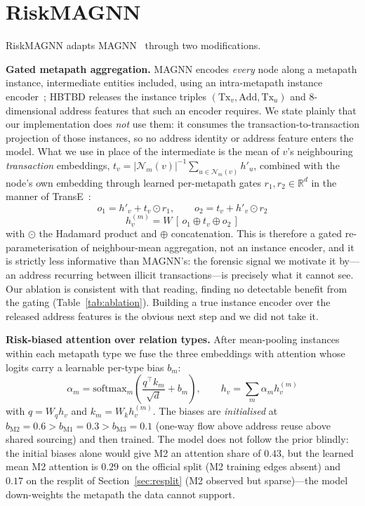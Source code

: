 \documentclass[conference]{IEEEtran}
\begin{document}
\section{RiskMAGNN}

RiskMAGNN adapts MAGNN~\cite{fu2020} through two modifications.

\textbf{Gated metapath aggregation.} MAGNN encodes \emph{every} node along a
metapath instance, intermediate entities included, using an intra-metapath
instance encoder~\cite{fu2020}; HBTBD releases the instance triples
$(\text{Tx}_v,\text{Add},\text{Tx}_u)$ and 8-dimensional address features
that such an encoder requires. We state plainly that our implementation does
\emph{not} use them: it consumes the transaction-to-transaction projection of
those instances, so no address identity or address feature enters the model.
What we use in place of the intermediate is the mean of $v$'s neighbouring
\emph{transaction} embeddings,
$t_v = |\mathcal{N}_m(v)|^{-1}\sum_{u \in \mathcal{N}_m(v)} h'_u$, combined
with the node's own embedding through learned per-metapath gates
$r_1, r_2 \in \mathbb{R}^d$ in the manner of TransE~\cite{bordes2013}:
\begin{equation}
o_1 = h'_v + t_v \odot r_1, \qquad
o_2 = t_v + h'_v \odot r_2
\end{equation}
\begin{equation}
h_v^{(m)} = W\,[\,o_1 \oplus t_v \oplus o_2\,]
\end{equation}
with $\odot$ the Hadamard product and $\oplus$ concatenation. This is
therefore a gated re-parameterisation of neighbour-mean aggregation, not an
instance encoder, and it is strictly less informative than MAGNN's: the
forensic signal we motivate it by---an address recurring between illicit
transactions---is precisely what it cannot see. Our ablation is consistent
with that reading, finding no detectable benefit from the gating
(Table~\ref{tab:ablation}). Building a true instance encoder over the
released address features is the obvious next step and we did not take it.

\textbf{Risk-biased attention over relation types.} After mean-pooling
instances within each metapath type we fuse the three embeddings with
attention whose logits carry a learnable per-type bias $b_m$:
\begin{equation}
\alpha_m = \mathrm{softmax}_m\!\left(\frac{q^\top k_m}{\sqrt{d}} + b_m\right),
\qquad
h_v = \sum_{m} \alpha_m h_v^{(m)}
\end{equation}
with $q = W_q h_v$ and $k_m = W_k h_v^{(m)}$. The biases are
\emph{initialised} at $b_{\text{M2}}=0.6 > b_{\text{M1}}=0.3 >
b_{\text{M3}}=0.1$ (one-way flow above address reuse above shared sourcing)
and then trained. The model does not follow the prior blindly: the initial
biases alone would give M2 an attention share of $0.43$, but the learned mean
M2 attention is $0.29$ on the official split (M2 training edges absent) and
$0.17$ on the resplit of Section~\ref{sec:resplit} (M2 observed but
sparse)---the model down-weights the metapath the data cannot support.
\end{document}
